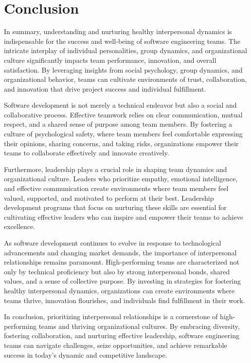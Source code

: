 \documentclass{article}
\begin{document}
\section{Conclusion}
In summary, understanding and nurturing healthy interpersonal dynamics is indispensable for the success and well-being of software engineering teams. The intricate interplay of individual personalities, group dynamics, and organizational culture significantly impacts team performance, innovation, and overall satisfaction. By leveraging insights from social psychology, group dynamics, and organizational behavior, teams can cultivate environments of trust, collaboration, and innovation that drive project success and individual fulfillment.

Software development is not merely a technical endeavor but also a social and collaborative process. Effective teamwork relies on clear communication, mutual respect, and a shared sense of purpose among team members. By fostering a culture of psychological safety, where team members feel comfortable expressing their opinions, sharing concerns, and taking risks, organizations empower their teams to collaborate effectively and innovate creatively.

Furthermore, leadership plays a crucial role in shaping team dynamics and organizational culture. Leaders who prioritize empathy, emotional intelligence, and effective communication create environments where team members feel valued, supported, and motivated to perform at their best. Leadership development programs that focus on nurturing these skills are essential for cultivating effective leaders who can inspire and empower their teams to achieve excellence.

As software development continues to evolve in response to technological advancements and changing market demands, the importance of interpersonal relationships remains paramount. High-performing teams are characterized not only by technical proficiency but also by strong interpersonal bonds, shared values, and a sense of collective purpose. By investing in strategies for fostering healthy interpersonal dynamics, organizations can create environments where teams thrive, innovation flourishes, and individuals find fulfillment in their work.

In conclusion, prioritizing interpersonal relationships is a cornerstone of high-performing teams and thriving organizational cultures. By embracing diversity, fostering collaboration, and nurturing effective leadership, software engineering teams can navigate challenges, seize opportunities, and achieve remarkable success in today's dynamic and competitive landscape.



\end{document}
